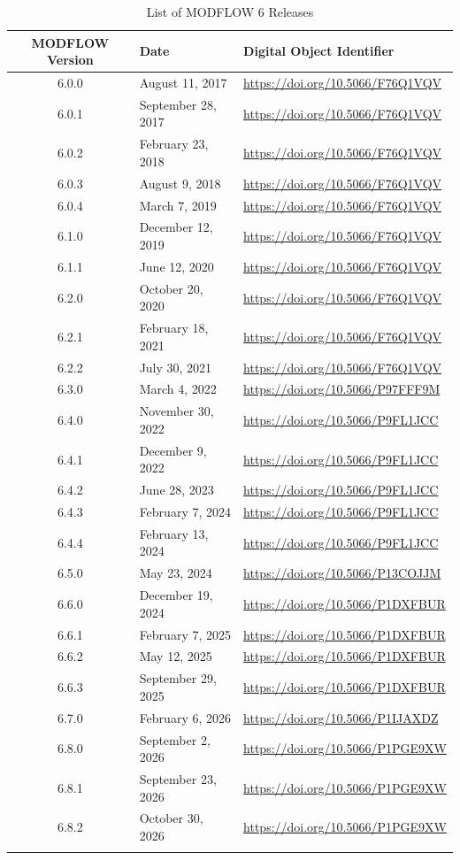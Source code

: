 \documentclass[11pt,twoside,twocolumn]{usgsreport}
\begin{document}
\begin{table}[h]
\begin{center}
\caption{List of MODFLOW 6 Releases}
\small 
\begin{tabular*}{13cm}{cll}
\hline
\hline
\textbf{MODFLOW Version} & \textbf{Date} & \textbf{Digital Object Identifier}\\
\hline
6.0.0 & August 11, 2017 & \url{https://doi.org/10.5066/F76Q1VQV} \\
6.0.1 & September 28, 2017 & \url{https://doi.org/10.5066/F76Q1VQV} \\
6.0.2 & February 23, 2018 & \url{https://doi.org/10.5066/F76Q1VQV} \\
6.0.3 & August 9, 2018 & \url{https://doi.org/10.5066/F76Q1VQV} \\
6.0.4 & March 7, 2019 & \url{https://doi.org/10.5066/F76Q1VQV} \\
6.1.0 & December 12, 2019 & \url{https://doi.org/10.5066/F76Q1VQV} \\
6.1.1 & June 12, 2020 & \url{https://doi.org/10.5066/F76Q1VQV} \\
6.2.0 & October 20, 2020 & \url{https://doi.org/10.5066/F76Q1VQV} \\
6.2.1 & February 18, 2021 & \url{https://doi.org/10.5066/F76Q1VQV} \\
6.2.2 & July 30, 2021 & \url{https://doi.org/10.5066/F76Q1VQV} \\
6.3.0 & March 4, 2022 & \url{https://doi.org/10.5066/P97FFF9M} \\
6.4.0 & November 30, 2022 & \url{https://doi.org/10.5066/P9FL1JCC} \\
6.4.1 & December 9, 2022 & \url{https://doi.org/10.5066/P9FL1JCC} \\
6.4.2 & June 28, 2023 & \url{https://doi.org/10.5066/P9FL1JCC} \\
6.4.3 & February 7, 2024 & \url{https://doi.org/10.5066/P9FL1JCC} \\
6.4.4 & February 13, 2024 & \url{https://doi.org/10.5066/P9FL1JCC} \\
6.5.0 & May 23, 2024 & \url{https://doi.org/10.5066/P13COJJM} \\
6.6.0 & December 19, 2024 & \url{https://doi.org/10.5066/P1DXFBUR} \\
6.6.1 & February 7, 2025 & \url{https://doi.org/10.5066/P1DXFBUR} \\
6.6.2 & May 12, 2025 & \url{https://doi.org/10.5066/P1DXFBUR} \\
6.6.3 & September 29, 2025 & \url{https://doi.org/10.5066/P1DXFBUR} \\
6.7.0 & February 6, 2026 & \url{https://doi.org/10.5066/P1IJAXDZ} \\
6.8.0 & September 2, 2026 & \url{https://doi.org/10.5066/P1PGE9XW} \\
6.8.1 & September 23, 2026 & \url{https://doi.org/10.5066/P1PGE9XW} \\
6.8.2 & October 30, 2026 & \url{https://doi.org/10.5066/P1PGE9XW} \\
\hline
\label{tab:releases}
\end{tabular*}
\end{center}
\normalsize
\end{table}
\end{document}
